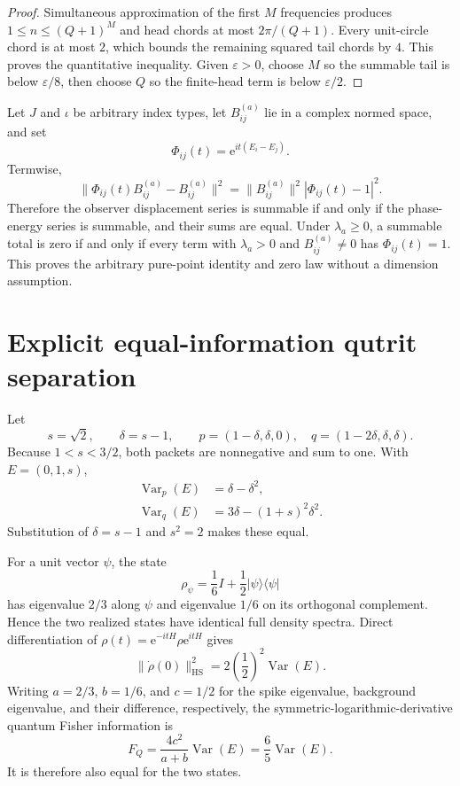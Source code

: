 \documentclass[10pt]{article}
\theoremstyle{definition}
\newcommand{\HS}{\mathrm{HS}}
\newcommand{\ee}{\mathrm e}
\begin{document}
\begin{proof}
Simultaneous approximation of the first \(M\) frequencies produces
\(1\leq n\leq(Q+1)^M\) and head chords at most \(2\pi/(Q+1)\).
Every unit-circle chord is at most \(2\), which bounds the remaining squared
tail chords by \(4\).  This proves the quantitative inequality.  Given
\(\varepsilon>0\), choose \(M\) so the summable tail is below
\(\varepsilon/8\), then choose \(Q\) so the finite-head term is below
\(\varepsilon/2\).
\end{proof}

Let \(J\) and \(\iota\) be arbitrary index types, let \(B^{(a)}_{ij}\) lie
in a complex normed space, and set
\[
 \Phi_{ij}(t)=\ee^{it(E_i-E_j)}.
\]
Termwise,
\[
 \|\Phi_{ij}(t)B^{(a)}_{ij}-B^{(a)}_{ij}\|^2
 =\|B^{(a)}_{ij}\|^2|\Phi_{ij}(t)-1|^2.
\]
Therefore the observer displacement series is summable if and only if the
phase-energy series is summable, and their sums are equal.  Under
\(\lambda_a\geq0\), a summable total is zero if and only if every term with
\(\lambda_a>0\) and \(B^{(a)}_{ij}\ne0\) has \(\Phi_{ij}(t)=1\).  This proves
the arbitrary pure-point identity and zero law without a dimension
assumption.

\section{Explicit equal-information qutrit separation}

\smallskip
\noindent
Let
\[
 s=\sqrt2,\qquad \delta=s-1,\qquad
 p=(1-\delta,\delta,0),\quad
 q=(1-2\delta,\delta,\delta).
\]
Because \(1<s<3/2\), both packets are nonnegative and sum to one.  With
\(E=(0,1,s)\),
\begin{align*}
 \operatorname{Var}_{p}(E)
 &=\delta-\delta^2,\\
 \operatorname{Var}_{q}(E)
 &=3\delta-(1+s)^2\delta^2.
\end{align*}
Substitution of \(\delta=s-1\) and \(s^2=2\) makes these equal.

For a unit vector \(\psi\), the state
\[
 \rho_\psi=\frac16I+\frac12|\psi\rangle\langle\psi|
\]
has eigenvalue \(2/3\) along \(\psi\) and eigenvalue \(1/6\) on its
orthogonal complement.  Hence the two realized states have identical full
density spectra.  Direct differentiation of
\(\rho(t)=\ee^{-itH}\rho\ee^{itH}\) gives
\[
 \|\dot\rho(0)\|_{\HS}^2
 =2\left(\frac12\right)^2\operatorname{Var}(E).
\]
Writing \(a=2/3\), \(b=1/6\), and \(c=1/2\) for the spike eigenvalue,
background eigenvalue, and their difference, respectively, the
symmetric-logarithmic-derivative quantum Fisher information is
\[
 F_Q=\frac{4c^2}{a+b}\operatorname{Var}(E)
 =\frac65\operatorname{Var}(E).
\]
It is therefore also equal for the two states.
\end{document}
